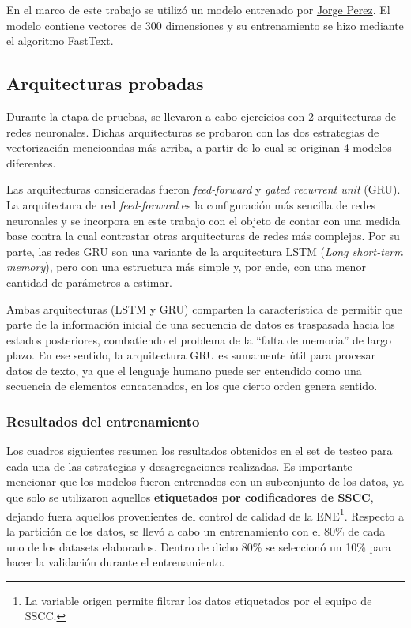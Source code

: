 \documentclass[
  12pt,
  spanish,
]{article}
\begin{document}
En el marco de este trabajo se utilizó un modelo entrenado por
\href{https://github.com/dccuchile/spanish-word-embeddings/blob/master/emb-from-suc.md}{Jorge
Perez}. El modelo contiene vectores de 300 dimensiones y su
entrenamiento se hizo mediante el algoritmo FastText.

\hypertarget{arquitecturas-probadas}{%
\subsection{Arquitecturas probadas}\label{arquitecturas-probadas}}

Durante la etapa de pruebas, se llevaron a cabo ejercicios con 2
arquitecturas de redes neuronales. Dichas arquitecturas se probaron con
las dos estrategias de vectorización mencioandas más arriba, a partir de
lo cual se originan 4 modelos diferentes.

Las arquitecturas consideradas fueron \emph{feed-forward} y \emph{gated
recurrent unit} (GRU). La arquitectura de red \emph{feed-forward} es la
configuración más sencilla de redes neuronales y se incorpora en este
trabajo con el objeto de contar con una medida base contra la cual
contrastar otras arquitecturas de redes más complejas. Por su parte, las
redes GRU son una variante de la arquitectura LSTM (\emph{Long
short-term memory}), pero con una estructura más simple y, por ende, con
una menor cantidad de parámetros a estimar.

Ambas arquitecturas (LSTM y GRU) comparten la característica de permitir
que parte de la información inicial de una secuencia de datos es
traspasada hacia los estados posteriores, combatiendo el problema de la
``falta de memoria'' de largo plazo. En ese sentido, la arquitectura GRU
es sumamente útil para procesar datos de texto, ya que el lenguaje
humano puede ser entendido como una secuencia de elementos concatenados,
en los que cierto orden genera sentido.

\hypertarget{resultados-del-entrenamiento}{%
\subsubsection{Resultados del
entrenamiento}\label{resultados-del-entrenamiento}}

Los cuadros siguientes resumen los resultados obtenidos en el set de
testeo para cada una de las estrategias y desagregaciones realizadas. Es
importante mencionar que los modelos fueron entrenados con un
subconjunto de los datos, ya que solo se utilizaron aquellos
\textbf{etiquetados por codificadores de SSCC}, dejando fuera aquellos
provenientes del control de calidad de la ENE\footnote{La variable
  origen permite filtrar los datos etiquetados por el equipo de SSCC.}.
Respecto a la partición de los datos, se llevó a cabo un entrenamiento
con el 80\% de cada uno de los datasets elaborados. Dentro de dicho 80\%
se seleccionó un 10\% para hacer la validación durante el entrenamiento.
\end{document}
